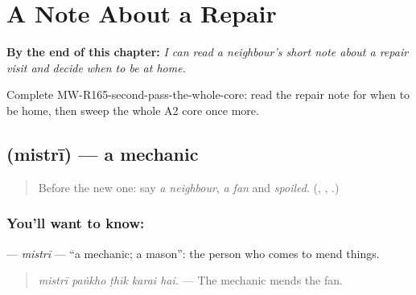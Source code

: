 
\chapter{A Note About a Repair}
\label{ch:mw-a2-a-note-about-a-repair}

\begin{chapteropening}
\textbf{By the end of this chapter:} \emph{I can read a neighbour's short note about a repair visit and decide when to be at home.}

Complete MW-R165-second-pass-the-whole-core: read the repair note for when to be home, then sweep the whole A2 core once more.
\end{chapteropening}

\section[\texorpdfstring{\mw{मिस्त्री} (mistrī)}{मिस्त्री (mistrī)}]{ (mistrī) — a mechanic}

\label{lesson:MW-C165-mistri}



\begin{quote}
Before the new one: say \emph{a neighbour}, \emph{a fan} and \emph{spoiled}. (\textbf{}, \textbf{}, \textbf{}.)
\end{quote}

\subsection*{You'll want to know: }
\textbf{} — \emph{mistrī} — \textquotedblleft{}a mechanic; a mason\textquotedblright{}: the person who comes to mend things.

\begin{quote}
\textbf{    }
\end{quote}

\begin{quote}
\emph{mistrī paṅkho ṭhīk karai hai.} — The mechanic mends the fan.
\end{quote}

\begin{quote}
\textbf{  }
\end{quote}

